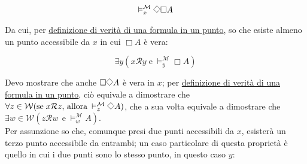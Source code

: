 \documentclass[a4paper,12pt]{article}
\newcommand{\Dmd}{\mathord{\vcenter{\hbox{\tikz[baseline=-0.6ex]{\draw[line width=0.4pt, scale=1, rotate=45] (0,0) rectangle (0.2,0.2);}}}}} %
\begin{document}
\begin{dimo}
\begin{enumerate}
		      \begin{minipage}{0.48\textwidth}
			      $$\vDash_x^{\mathcal{M}} \Dmd \Box A$$
		      \end{minipage}
		      \begin{minipage}{0.48\textwidth}
			      \begin{center}
			      \end{center}
		      \end{minipage}
		      \vspace{8pt}

		      Da cui, per \hyperlink{defverp}{definizione di verità di una formula in un punto}, so che esiste almeno un punto accessibile da $x$ in cui $\Box A$ è vera: \\

		      \begin{minipage}{0.48\textwidth}
			      $$\exists y (x\mathcal{R}y \; \text{e} \; \vDash_y^{\mathcal{M}}\Box  A)$$
		      \end{minipage}
		      \begin{minipage}{0.48\textwidth}
			      \begin{center}
			      \end{center}
			      \vspace{8pt}

		      \end{minipage}
		      \vspace{8pt}

		      Devo mostrare che anche $\Box \Dmd A$ è vera in $x$; per \hyperlink{defverp}{definizione di verità di una formula in un punto}, ciò equivale a dimostrare che $\forall z \in \mathcal{W} (\text{se} \; x\mathcal{R}z  \text{, allora} \: \vDash_z^{\mathcal{M}} \Dmd A)$, che a sua volta equivale a dimostrare che $\exists w \in \mathcal{W} (z\mathcal{R}w \;\, \text{e} \; \vDash_w^{\mathcal{M}} A)$.\\
		      Per assunzione so che, comunque presi due punti accessibili da $x$, esisterà un terzo punto accessibile da entrambi; un caso particolare di questa proprietà è quello in cui i due punti sono lo stesso punto, in questo caso $y$:


\end{enumerate}
\end{dimo}
\end{document}
